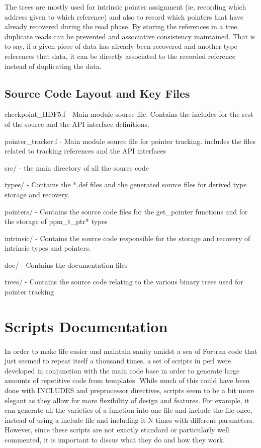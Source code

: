\documentclass{article}
\begin{document}
The trees are mostly used for intrinsic pointer assignment (ie, recording which address given to which reference) and also to record which pointers that have already recovered during the read phase. By storing the references in a tree, duplicate reads can be prevented and associative consistency maintained. That is to say, if a given piece of data has already been recovered and another type references that data, it can be directly associated to the recorded reference instead of duplicating the data.

\subsection{Source Code Layout and Key Files}
\begin{list}{}{}
\item checkpoint\_HDF5.f - Main module source file. Contains the includes for the rest of the source and the API interface definitions.
\item pointer\_tracker.f - Main module source file for pointer tracking. includes the files related to tracking references and the API interfaces
\item src/ - the main directory of all the source code
\item types/ - Contains the *.def files and the generated source files for derived type storage and recovery.
\item pointers/ - Contains the source code files for the get\_pointer functions and for the storage of ppm\_t\_ptr* types
\item intrinsic/ - Contains the source code responsible for the storage and recovery of intrinsic types and pointers.
\item doc/ - Contains the documentation files
\item trees/ - Contains the source code relating to the various binary trees used for pointer tracking
\end{list}

\section{Scripts Documentation}
\paragraph{}
In order to make life easier and maintain sanity amidst a sea of Fortran code that just seemed to repeat itself a thousand times, a set of scripts in perl were developed in conjunction with the main code base in order to generate large amounts of repetitive code from templates. While much of this could have been done with INCLUDES and preprocessor directives, scripts seem to be a bit more elegant as they allow for more flexibility of design and features. For example, it can generate all the varieties of a function into one file and include the file once, instead of using a include file and including it N times with different parameters. However, since these scripts are not exactly standard or particularly well commented, it is important to discus what they do and how they work.
\end{document}
